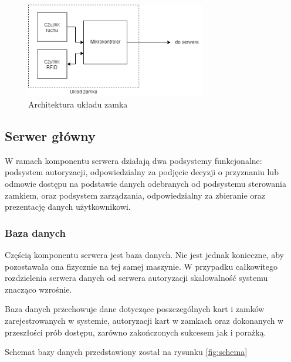                         \begin{figure}
                                \centering
                                \includegraphics[width=0.7\textwidth]{chapters/images/lock.png}
                                \caption{Architektura układu zamka}
                                \label{fig:lock-arch}
                        \end{figure}

                \subsection{Serwer główny}
                        W ramach komponentu serwera działają dwa podsystemy funkcjonalne: podsystem autoryzacji, odpowiedzialny za podjęcie decyzji o przyznaniu lub odmowie dostępu na podstawie danych odebranych od podsystemu sterowania zamkiem, oraz podsystem zarządzania, odpowiedzialny za zbieranie oraz prezentację danych użytkownikowi.

                        \subsubsection{Baza danych}
                                Częścią komponentu serwera jest baza danych. Nie jest jednak konieczne, aby pozostawała ona fizycznie na tej samej maszynie. W przypadku całkowitego rozdzielenia serwera danych od serwera autoryzacji skalowalność systemu znacząco wzrośnie.

                                Baza danych przechowuje dane dotyczące poszczególnych kart i zamków zarejestrowanych w systemie, autoryzacji kart w zamkach oraz dokonanych w przeszłości prób dostępu, zarówno zakończonych sukcesem jak i porażką.

                                Schemat bazy danych przedstawiony został na rysunku \ref{fig:schema}

